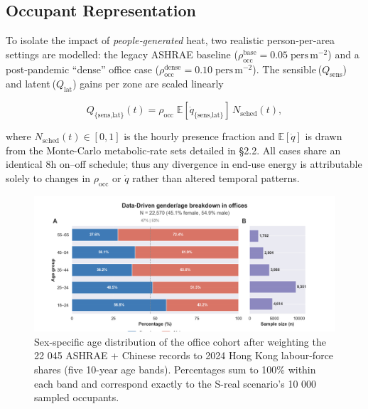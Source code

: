 

\subsection{Occupant Representation}\label{sec:occupant}

To isolate the impact of \emph{people‐generated} heat, two realistic person‐per‐area settings are modelled: the legacy ASHRAE baseline ($\rho_{\text{occ}}^{\text{base}}=0.05\;\text{pers}\,\text{m}^{-2}$) and a post-pandemic “dense” office case ($\rho_{\text{occ}}^{\text{dense}}=0.10\;\text{pers}\,\text{m}^{-2}$)\cite{Ling2024densities}.  
The sensible ($Q_{\text{sens}}$) and latent ($Q_{\text{lat}}$) gains per zone are scaled linearly

\begin{equation}
Q_{\{\text{sens,lat}\}}(t)=\rho_{\text{occ}}\;
        \mathbb{E}\!\left[\dot{q}_{\{\text{sens,lat}\}}\right]\,
        N_{\text{sched}}(t),
\end{equation}

where $N_{\text{sched}}(t)\!\in\![0,1]$ is the hourly presence fraction and  
$\mathbb{E}[\dot{q}]$ is drawn from the Monte-Carlo metabolic‐rate sets detailed in §2.2.  All cases share an identical 8h on–off schedule; thus any divergence in end‐use energy is attributable solely to changes in $\rho_{\text{occ}}$ or $\dot{q}$ rather than altered temporal patterns.

\begin{figure}[h!]
    \centering
    \includegraphics[width=0.75\linewidth]{figs/age_gen_breakdown.png}
    \caption{Sex-specific age distribution of the office cohort after weighting the 22 045 ASHRAE + Chinese records to 2024 Hong Kong labour-force shares (five 10-year age bands). Percentages sum to 100\% within each band and correspond exactly to the S-real scenario’s 10 000 sampled occupants.}
    \label{fig:age_sex}
\end{figure}

